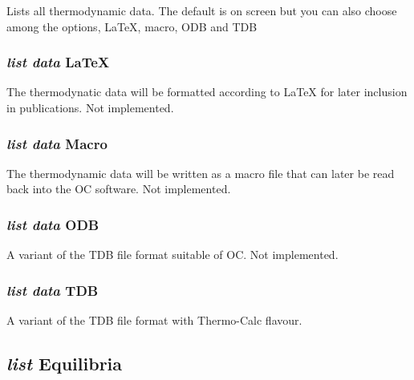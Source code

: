 \documentclass[12pt]{article}
\begin{document}
Lists all thermodynamic data.  The default is on screen but you can also
choose among the options, LaTeX, macro, ODB and TDB

\subsubsection{{\em list data} LaTeX}

The thermodynatic data will be formatted according to LaTeX for later
inclusion in publications.  Not implemented.

\subsubsection{{\em list data} Macro}

The thermodynamic data will be written as a macro file that can later
be read back into the OC software.  Not implemented.

\subsubsection{{\em list data} ODB}

A variant of the TDB file format suitable of OC.  Not implemented.

\subsubsection{{\em list data} TDB}

A variant of the TDB file format with Thermo-Calc flavour.

\subsection{{\em list} Equilibria}
\end{document}
